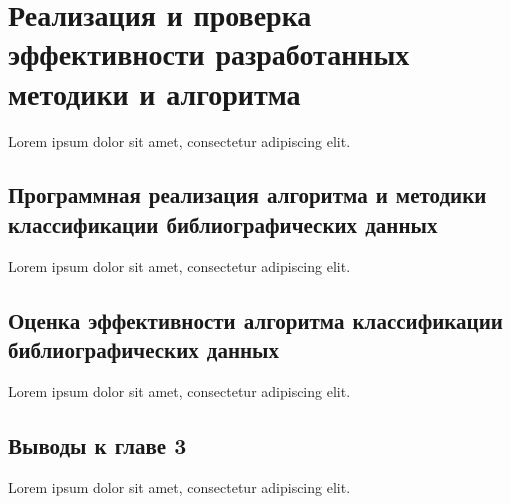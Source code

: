 \chapter{ Реализация и проверка эффективности разработанных методики и алгоритма }
Lorem ipsum dolor sit amet, consectetur adipiscing elit.

\section{Программная реализация алгоритма и методики классификации библиографических данных}
Lorem ipsum dolor sit amet, consectetur adipiscing elit.

\section{Оценка эффективности алгоритма классификации библиографических данных}
Lorem ipsum dolor sit amet, consectetur adipiscing elit.

\section*{Выводы к главе 3}
Lorem ipsum dolor sit amet, consectetur adipiscing elit.
